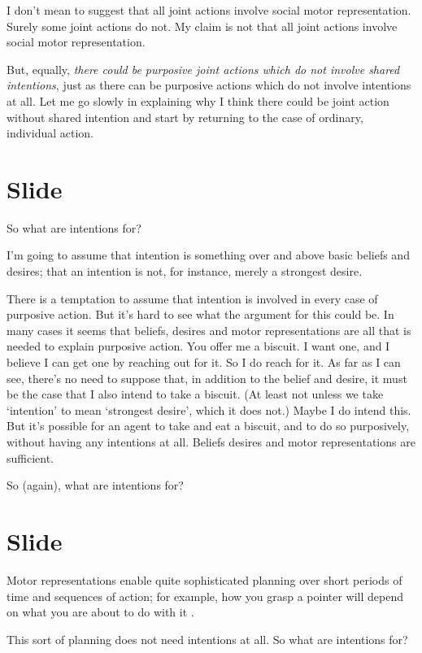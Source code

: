 \documentclass[12pt,\papersize]{extarticle}
\begin{document}
I don’t mean to suggest that all joint actions involve social motor representation.  Surely some joint actions do not.  My claim is not that all joint actions involve social motor representation.  

But, equally, \emph{there could be purposive joint actions which do not involve shared intentions},
just as there can be purposive actions which do not involve intentions at all.
Let me go slowly in explaining why I think there could be joint action without shared intention and start by returning to the case of ordinary, individual action.




\section{Slide}
So what are intentions for?

I’m going to assume that intention is something over and above basic beliefs and desires; that an intention is not, for instance, merely a strongest desire.

There is a temptation to assume that intention is involved in every case of purposive action.
But it’s hard to see what the argument for this could be.
In many cases it seems that beliefs, desires and motor representations are all that is needed to explain purposive action. 
You offer me a biscuit.  I want one, and I believe I can get one by reaching out for it.  So I do reach for it.  As far as I can see, there’s no need to suppose that, in addition to the belief and desire, it must be the case that I also intend to take a biscuit.  
(At least not unless we take ‘intention’ to mean ‘strongest desire’, which it does not.)  
Maybe I do intend this.  
But it’s possible for an agent to take and eat a biscuit, and to do so purposively, without having any intentions at all.  
Beliefs desires and motor representations are sufficient.

So (again), what are intentions for?



\section{Slide}
Motor representations enable quite sophisticated planning over short periods of time and sequences of action; for example, how you grasp a pointer will depend on what you are about to do with it \citep{zhang:2007_planning}.

This sort of planning does not need intentions at all.  So what are intentions for?
\end{document}
